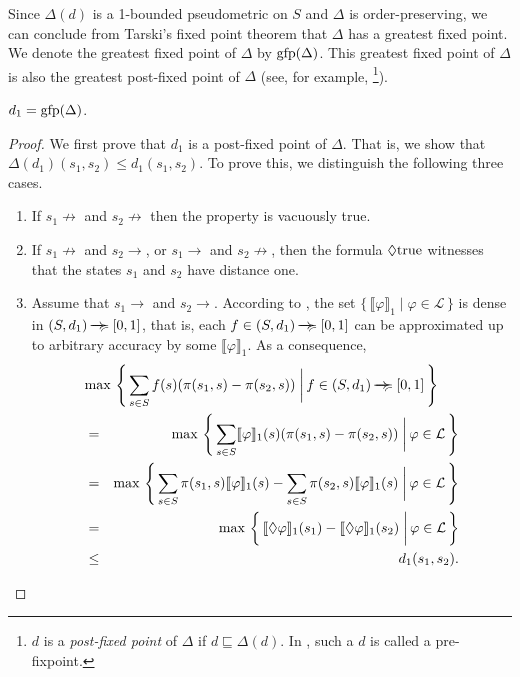 \documentclass{LMCS}
\newcommand{\ndi}{\mathbin{\raisebox{0.15ex}{-\hspace{-0.2em}-\hspace{-0.2em}-\hspace{-0.2em}-\hspace{-0.2em}-\hspace{-0.2em}-}\hspace{-0.7em}\succcurlyeq}}
\newcommand{\gfp}{\mbox{\rm gfp}}
\newcommand{\unterpretation}[1]{\llbracket #1 \rrbracket_{1}}
\newcommand{\modality}{\lozenge}
\newcommand{\bigmid}{\; \bigg| \,}
\begin{document}
Since $\Delta(d)$ is a 1-bounded pseudometric on $S$ and $\Delta$ is 
order-preserving, we can conclude from Tarski's fixed point theorem 
\cite[Theorem~1]{T55:pjm} that $\Delta$ has a greatest fixed point.
We denote the greatest fixed point of $\Delta$ by $\gfp(\Delta)$.
This greatest fixed point of $\Delta$ is also the greatest post-fixed
point of $\Delta$ (see, for example, \cite[Theorem~4.11]{DP90}\footnote{$d$ is a {\em post-fixed point\/} of $\Delta$ if $d \sqsubseteq \Delta(d)$.
In \cite[page~94]{DP90}, such a $d$ is called a pre-fixpoint.}).

\begin{thm}
\label{proposition:6}
$d_1 = \gfp(\Delta)$.
\end{thm}

\begin{proof}
We first prove that $d_1$ is a post-fixed point of $\Delta$.  
That is, we show that $\Delta(d_1)(s_1, s_2) \leq d_1(s_1, s_2)$.  
To prove this, we distinguish the following three cases.
\begin{enumerate}[$\bullet$]
\item
If $s_1 \not\rightarrow$ and $s_2 \not\rightarrow$ then 
the property is vacuously true.
\item
If $s_1 \not\rightarrow$ and $s_2 \rightarrow$, or
$s_1 \rightarrow$ and $s_2 \not\rightarrow$, then
the formula $\modality \mbox{\rm true}$ witnesses that the
states $s_1$ and $s_2$ have distance one.
\item
Assume that $s_1 \rightarrow$ and $s_2 \rightarrow$.
According to \cite[Proposition~39]{BW05:tcs}, the set
$\{\, \unterpretation{\varphi} \mid \varphi \in \mathcal{L} \,\}$
is dense in $(S, d_1) \ndi [0, 1]$, that is,
each $f \in (S, d_1) \ndi [0, 1]$ can be approximated up to
arbitrary accuracy by some $\unterpretation{\varphi}$.  As a consequence,
\begin{eqnarray*}
\lefteqn{\max\, \left \{\, \sum_{s \in S} f(s) (\pi(s_1, s) - \pi(s_2, s)) \bigmid f \in (S, d_1) \ndi [0, 1] \, \right \}}\\
& = & \max\, \left \{\, \sum_{s \in S} \unterpretation{\varphi}(s) (\pi(s_1, s) - \pi(s_2, s)) \bigmid \varphi \in \mathcal{L} \, \right \}\\
& = & \max\, \left \{\, \sum_{s \in S} \pi(s_1, s) \unterpretation{\varphi}(s) - \sum_{s \in S} \pi(s_2, s) \unterpretation{\varphi}(s) \bigmid \varphi \in \mathcal{L} \, \right \}\\
& = & \max\, \left \{\, \unterpretation{\modality \varphi}(s_1) - \unterpretation{\modality \varphi}(s_2) \bigmid \varphi \in \mathcal{L} \, \right \}\\
& \leq & d_1(s_1, s_2).
\end{eqnarray*}
\end{enumerate}


\end{proof}
\end{document}
